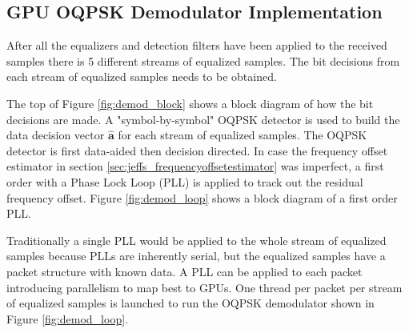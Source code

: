 \clearpage
\subsection{GPU OQPSK Demodulator Implementation}
After all the equalizers and detection filters have been applied to the received samples there is 5 different streams of equalized samples.
The bit decisions from each stream of equalized samples needs to be obtained.

The top of Figure \ref{fig:demod_block} shows a block diagram of how the bit decisions are made.
A "symbol-by-symbol" OQPSK detector is used to build the data decision vector $\hat{\mathbf{a}}$ for each stream of equalized samples.
The OQPSK detector is first data-aided then decision directed. 
In case the frequency offset estimator in section \ref{sec:jeffs_frequencyoffsetestimator} was imperfect, a first order  with a Phase Lock Loop (PLL) is applied to track out the residual frequency offset.
Figure \ref{fig:demod_loop} shows a block diagram of a first order PLL.

Traditionally a single PLL would be applied to the whole stream of equalized samples because PLLs are inherently serial, but the equalized samples have a packet structure with known data.
A PLL can be applied to each packet introducing parallelism to map best to GPUs.
One thread per packet per stream of equalized samples is launched to run the OQPSK demodulator shown in Figure \ref{fig:demod_loop}.

